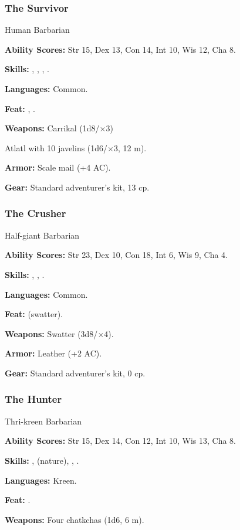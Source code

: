 \subsubsection{The Survivor}
Human Barbarian

\textbf{Ability Scores:} Str 15, Dex 13, Con 14, Int 10, Wis 12, Cha 8.

\textbf{Skills:} , , , .

\textbf{Languages:} Common.

\textbf{Feat:} , .

\textbf{Weapons:} Carrikal (1d8/$\times$3)

Atlatl with 10 javelins (1d6/$\times$3, 12 m).

\textbf{Armor:} Scale mail (+4 AC).

\textbf{Gear:} Standard adventurer's kit, 13 cp.

\subsubsection{The Crusher}
Half-giant Barbarian

\textbf{Ability Scores:} Str 23, Dex 10, Con 18, Int 6, Wis 9, Cha 4.

\textbf{Skills:} , , .

\textbf{Languages:} Common.

\textbf{Feat:}  (swatter).

\textbf{Weapons:} Swatter (3d8/$\times$4).

\textbf{Armor:} Leather (+2 AC).

\textbf{Gear:} Standard adventurer's kit, 0 cp.

\subsubsection{The Hunter}
Thri-kreen Barbarian

\textbf{Ability Scores:} Str 15, Dex 14, Con 12, Int 10, Wis 13, Cha 8.

\textbf{Skills:} ,  (nature), , .

\textbf{Languages:} Kreen.

\textbf{Feat:} .

\textbf{Weapons:} Four chatkchas (1d6, 6 m).

